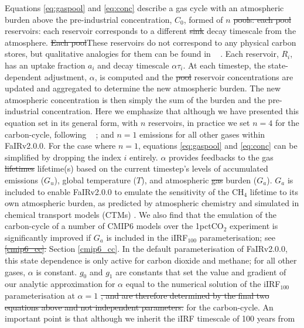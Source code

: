 \documentclass[gmd, manuscript]{copernicus}
\providecommand{\DIFadd}[1]{{\protect\color{blue}#1}} %
\providecommand{\DIFdel}[1]{{\protect\color{red}\sout{#1}}}                      %
\providecommand{\DIFaddbegin}{} %
\providecommand{\DIFaddend}{} %
\providecommand{\DIFdelbegin}{} %
\providecommand{\DIFdelend}{} %
\begin{document}
\DIFaddend Equations \ref{eq:gaspool} and \ref{eq:conc} describe a gas cycle with an atmospheric burden above the pre-industrial concentration, $C_0$, formed of $n$ \DIFdelbegin \DIFdel{pools: each pool }\DIFdelend \DIFaddbegin \DIFadd{reservoirs: each reservoir }\DIFaddend corresponds to a different \DIFdelbegin \DIFdel{sink }\DIFdelend \DIFaddbegin \DIFadd{decay timescale }\DIFaddend from the atmosphere. \DIFdelbegin \DIFdel{Each pool}\DIFdelend \DIFaddbegin \DIFadd{These reservoirs do not correspond to any physical carbon stores, but qualitative analogies for them can be found in \mbox{%
\citet{Millar2016}}\hspace{0pt}%
. Each reservoir}\DIFaddend , $R_i$, has an uptake fraction $a_i$ and decay timescale $\alpha \tau_i$. At each timestep, the state-dependent adjustment, $\alpha$, is computed and the \DIFdelbegin \DIFdel{pool }\DIFdelend \DIFaddbegin \DIFadd{reservoir }\DIFaddend concentrations are updated and aggregated to determine the new atmospheric burden. The new atmospheric concentration is then simply the sum of the burden and the pre-industrial concentration. \DIFaddbegin \DIFadd{Here we emphasize that although we have presented this equation set in its general form, with $n$ reservoirs, in practice we set $n=4$ for the carbon-cycle, following \mbox{%
\citet{Joos2013}}\hspace{0pt}%
; and $n=1$ emissions for all other gases within FaIRv2.0.0. For the case where $n=1$, equations \ref{eq:gaspool} and \ref{eq:conc} can be simplified by dropping the index $i$ entirely. }\DIFaddend $\alpha$ provides feedbacks to the gas \DIFdelbegin \DIFdel{lifetimes }\DIFdelend \DIFaddbegin \DIFadd{lifetime(s) }\DIFaddend based on the current timestep’s levels of accumulated emissions ($G_u$), global temperature ($T$), and atmospheric \DIFdelbegin \DIFdel{gas }\DIFdelend burden ($G_a$). $G_a$ is included to enable FaIRv2.0\DIFaddbegin \DIFadd{.0 }\DIFaddend to emulate the sensitivity of the CH$_4$ lifetime to its own atmospheric burden, as predicted by atmospheric chemistry and simulated in chemical transport models (CTMs) \citep{Holmes2013,Prather2015}. We also find that the emulation of the carbon-cycle of a number of CMIP6 models over the 1pctCO$_2$ experiment is significantly improved if $G_a$ is included in the iIRF$_{100}$ parameterisation; see \DIFdelbegin \DIFdel{\ref{cmip6_cc}. }\DIFdelend \DIFaddbegin \DIFadd{Section \ref{cmip6_cc}. In the default parameterisation of FaIRv2.0.0, this state dependence is only active for carbon dioxide and methane; for all other gases, $\alpha$ is constant. }\DIFaddend $g_0$ and $g_1$ \DIFaddbegin \DIFadd{are constants that }\DIFaddend set the value and gradient of our analytic approximation for $\alpha$ equal to the numerical solution of the \citet{Millar2016} iIRF$_{100}$ parameterisation at $\alpha = 1$ \DIFdelbegin \DIFdel{, and are therefore determined by the final two equations above and not independent parameters. }\DIFdelend \DIFaddbegin \DIFadd{for the carbon-cycle. An important point is that although we inherit the iIRF timescale of 100 years from \mbox{%
}}
\end{document}
